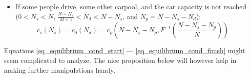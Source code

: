 \documentclass[english, a4paper]{article}
\theoremstyle{plain}
\theoremstyle{definition}
\theoremstyle{remark}
\begin{document}
\begin{itemize}
        Having $c_d \left( \frac{N-N_s}{M+1} \right) > c_p \left( \frac{N-N_s}{M+1}, F^{-1} \left( \frac{N-N_s}{N}\times \frac{M}{M+1} \right) \right)$ would lead to no equilibrium.

    \item If some people drive, some other carpool, and the car capacity is not reached ($0 < N_s < N$, $\frac{N - N_s}{M+1} < N_d < N - N_s$, and $N_p = N - N_s - N_d$):
        \begin{equation}
            \label{eq_equilibrium_cond_finish}
            c_s(N_s) = c_d ( N_d ) = c_p\left(N - N_s - N_p, F^{-1}\left( \frac{N - N_s - N_p}{N} \right) \right)
        \end{equation}
\end{itemize}

Equations \ref{eq_equilibrium_cond_start} --- \ref{eq_equilibrium_cond_finish} might seem complicated to analyze. The nice proposition below will however help in making further manipulations handy.
\end{document}
